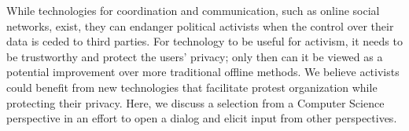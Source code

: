 
While technologies for coordination and communication, such as online social networks, exist, they can endanger political activists when the control over their data is ceded to third parties. For technology to be useful for activism, it needs to be trustworthy and protect the users' privacy; only then can it be viewed as a potential improvement over more traditional offline methods.  We believe activists could benefit from new technologies that facilitate protest organization while protecting their privacy.  Here, we discuss a selection from a Computer Science perspective in an effort to open a dialog and elicit input from other perspectives.


